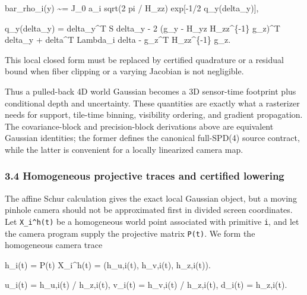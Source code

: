 \documentclass[
]{article}
\newenvironment{Shaded}{}{}
\newcommand{\NormalTok}[1]{#1}
\begin{document}
\begin{Shaded}
\begin{Highlighting}[]
\NormalTok{bar\_rho\_i(y)}
\NormalTok{  \textasciitilde{}= J\_0 a\_i sqrt(2 pi / H\_zz) exp[{-}1/2 q\_y(delta\_y)],}

\NormalTok{q\_y(delta\_y)}
\NormalTok{  = delta\_y\^{}T S delta\_y}
\NormalTok{    {-} 2 (g\_y {-} H\_yz H\_zz\^{}\{{-}1\} g\_z)\^{}T delta\_y}
\NormalTok{    + delta\^{}T Lambda\_i delta {-} g\_z\^{}T H\_zz\^{}\{{-}1\} g\_z.}
\end{Highlighting}
\end{Shaded}

This local closed form must be replaced by certified quadrature or a
residual bound when fiber clipping or a varying Jacobian is not
negligible.

Thus a pulled-back 4D world Gaussian becomes a 3D sensor-time footprint
plus conditional depth and uncertainty. These quantities are exactly
what a rasterizer needs for support, tile-time binning, visibility
ordering, and gradient propagation. The covariance-block and
precision-block derivations above are equivalent Gaussian identities;
the former defines the canonical full-SPD(4) source contract, while the
latter is convenient for a locally linearized camera map.

\subsubsection{3.4 Homogeneous projective traces and certified
lowering}\label{homogeneous-projective-traces-and-certified-lowering}

The affine Schur calculation gives the exact local Gaussian object, but
a moving pinhole camera should not be approximated first in divided
screen coordinates. Let \texttt{X\_i\^{}h(t)} be a homogeneous world
point associated with primitive \texttt{i}, and let the camera program
supply the projective matrix \texttt{P(t)}. We form the homogeneous
camera trace

\begin{Shaded}
\begin{Highlighting}[]
\NormalTok{h\_i(t) = P(t) X\_i\^{}h(t)}
\NormalTok{       = (h\_u,i(t), h\_v,i(t), h\_z,i(t)).}

\NormalTok{u\_i(t) = h\_u,i(t) / h\_z,i(t),}
\NormalTok{v\_i(t) = h\_v,i(t) / h\_z,i(t),}
\NormalTok{d\_i(t) = h\_z,i(t).}
\end{Highlighting}
\end{Shaded}
\end{document}
